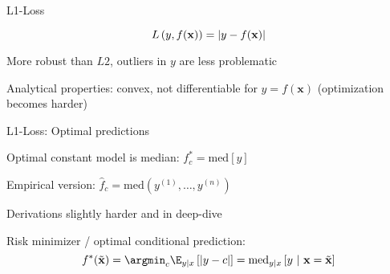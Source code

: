 \documentclass[11pt,compress,t,notes=noshow, xcolor=table]{beamer}
\begin{document}
\begin{framei}{L1-Loss}

\item $$
L\left(y, f(\mathbf{x})\right) = \left|y-f(\mathbf{x})\right|
$$

\item More robust than $L2$, outliers in $y$ are less problematic
\item Analytical properties: convex, not differentiable for $y = f(\bm{x})$ (optimization becomes harder)

\vfill


\end{framei}


\begin{framei}[sep=L]{L1-Loss: Optimal predictions}

\item Optimal constant model is median: 
$f_{c}^{\ast} = \text{med} [y]$

\item Empirical version: $\hat{f}_c = \text{med}(y^{(1)}, \ldots, y^{(n)}) $  

\item Derivations slightly harder and in deep-dive

\item Risk minimizer / optimal conditional prediction:
  $$
    f^{\ast}(\xtil) = \argmin_c \E_{y|x}\left[|y - c|\right]= \text{med}_{y|x} \left[y ~|~ \xv = \xtil \right]
  $$

\end{framei}



\endlecture
\end{document}
